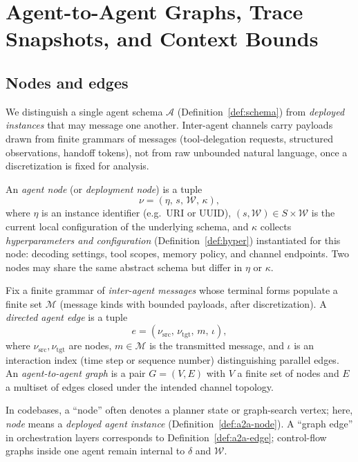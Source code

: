 \section{Agent-to-Agent Graphs, Trace Snapshots, and Context Bounds}
\label{sec:graphs}

\subsection{Nodes and edges}

We distinguish a single agent schema $\mathcal{A}$ (Definition~\ref{def:schema}) from \emph{deployed instances} that may message one another. Inter-agent channels carry payloads drawn from finite grammars of messages (tool-delegation requests, structured observations, handoff tokens), not from raw unbounded natural language, once a discretization is fixed for analysis.

\begin{definition}
\label{def:a2a-node}
An \emph{agent node} (or \emph{deployment node}) is a tuple
\[
\nu = (\eta,\, s,\, \mathcal{W},\, \kappa),
\]
where $\eta$ is an instance identifier (e.g.\ URI or UUID), $(s,\mathcal{W}) \in S \times \mathcal{W}$ is the current local configuration of the underlying schema, and $\kappa$ collects \emph{hyperparameters and configuration} (Definition~\ref{def:hyper}) instantiated for this node: decoding settings, tool scopes, memory policy, and channel endpoints. Two nodes may share the same abstract schema but differ in $\eta$ or $\kappa$.
\end{definition}

\begin{definition}
\label{def:a2a-edge}
Fix a finite grammar of \emph{inter-agent messages} whose terminal forms populate a finite set $\mathcal{M}$ (message kinds with bounded payloads, after discretization). A \emph{directed agent edge} is a tuple
\[
e = (\nu_{\mathrm{src}},\, \nu_{\mathrm{tgt}},\, m,\, \iota),
\]
where $\nu_{\mathrm{src}}, \nu_{\mathrm{tgt}}$ are nodes, $m \in \mathcal{M}$ is the transmitted message, and $\iota$ is an interaction index (time step or sequence number) distinguishing parallel edges. An \emph{agent-to-agent graph} is a pair $G=(V,E)$ with $V$ a finite set of nodes and $E$ a multiset of edges closed under the intended channel topology.
\end{definition}

\begin{remark}
In codebases, a ``node'' often denotes a planner state or graph-search vertex; here, \emph{node} means a \emph{deployed agent instance} (Definition~\ref{def:a2a-node}). A ``graph edge'' in orchestration layers corresponds to Definition~\ref{def:a2a-edge}; control-flow graphs inside one agent remain internal to $\delta$ and $\mathcal{W}$.
\end{remark}


